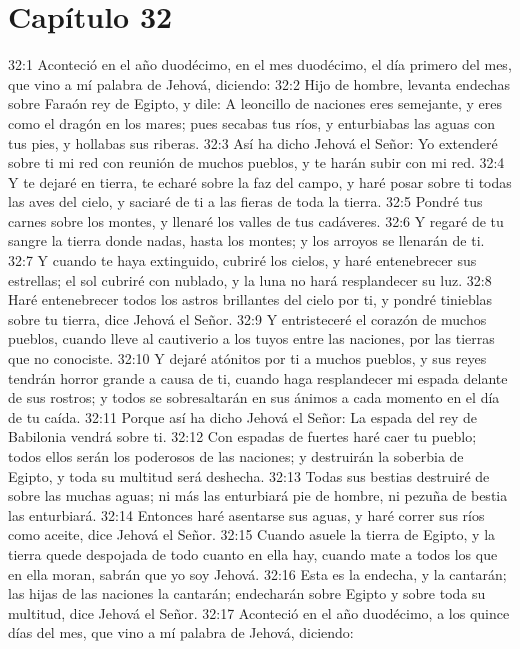 \section*{Capítulo 32 } 
  
32:1 Aconteció en el año duodécimo, en el mes duodécimo, el día primero del mes, que vino a mí palabra de Jehová, diciendo:   
32:2 Hijo de hombre, levanta endechas sobre Faraón rey de Egipto, y dile: A leoncillo de naciones eres semejante, y eres como el dragón en los mares; pues secabas tus ríos, y enturbiabas las aguas con tus pies, y hollabas sus riberas.   
32:3 Así ha dicho Jehová el Señor: Yo extenderé sobre ti mi red con reunión de muchos pueblos, y te harán subir con mi red.   
32:4 Y te dejaré en tierra, te echaré sobre la faz del campo, y haré posar sobre ti todas las aves del cielo, y saciaré de ti a las fieras de toda la tierra.   
32:5 Pondré tus carnes sobre los montes, y llenaré los valles de tus cadáveres.   
32:6 Y regaré de tu sangre la tierra donde nadas, hasta los montes; y los arroyos se llenarán de ti.   
32:7 Y cuando te haya extinguido, cubriré los cielos, y haré entenebrecer sus estrellas; el sol cubriré con nublado, y la luna no hará resplandecer su luz. 
32:8 Haré entenebrecer todos los astros brillantes del cielo por ti, y pondré tinieblas sobre tu tierra, dice Jehová el Señor.   
32:9 Y entristeceré el corazón de muchos pueblos, cuando lleve al cautiverio a los tuyos entre las naciones, por las tierras que no conociste.   
32:10 Y dejaré atónitos por ti a muchos pueblos, y sus reyes tendrán horror grande a causa de ti, cuando haga resplandecer mi espada delante de sus rostros; y todos se sobresaltarán en sus ánimos a cada momento en el día de tu caída.   
32:11 Porque así ha dicho Jehová el Señor: La espada del rey de Babilonia vendrá sobre ti.   
32:12 Con espadas de fuertes haré caer tu pueblo; todos ellos serán los poderosos de las naciones; y destruirán la soberbia de Egipto, y toda su multitud será deshecha.   
32:13 Todas sus bestias destruiré de sobre las muchas aguas; ni más las enturbiará pie de hombre, ni pezuña de bestia las enturbiará.   
32:14 Entonces haré asentarse sus aguas, y haré correr sus ríos como aceite, dice Jehová el Señor.   
32:15 Cuando asuele la tierra de Egipto, y la tierra quede despojada de todo cuanto en ella hay, cuando mate a todos los que en ella moran, sabrán que yo soy Jehová.   
32:16 Esta es la endecha, y la cantarán; las hijas de las naciones la cantarán; endecharán sobre Egipto y sobre toda su multitud, dice Jehová el Señor.   
32:17 Aconteció en el año duodécimo, a los quince días del mes, que vino a mí palabra de Jehová, diciendo:   
